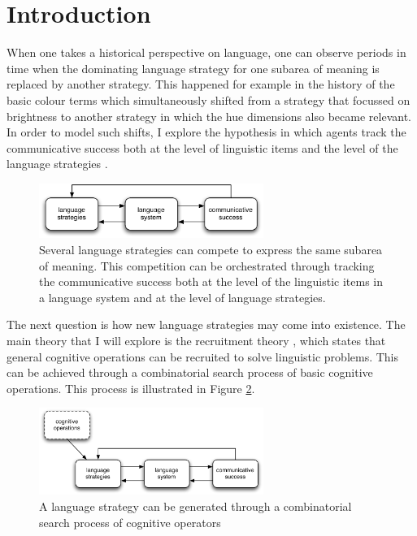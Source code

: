 \section*{Introduction}

\addtocounter{chapter}{1}
\setcounter{figure}{0}

When one takes a historical perspective on language, one can observe
periods in time when the dominating language strategy for one subarea
of meaning is replaced by another strategy. This happened for example
in the history of the basic colour terms which simultaneously shifted
from a strategy that focussed on brightness to another strategy in
which the hue dimensions also became relevant. In order to model such
shifts, I explore the hypothesis in which agents track the
communicative success both at the level of linguistic items and the
level of the language strategies \citep{bleys09linguistic}.

\begin{figure}[htbp]
  \begin{center}
    \includegraphics[width=0.65\textwidth]{./intro/figures/strategies-2.pdf}
    \caption[Several strategies competing to express the same subarea
    of meaning]{Several language strategies can compete to express the
      same subarea of meaning. This competition can be orchestrated
      through tracking the communicative success both at the level of
      the linguistic items in a language system and at the level of
      language strategies.}
    \label{f:strategies-2}
  \end{center}
\end{figure}

The next question is how new language strategies may come into
existence. The main theory that I will explore is the recruitment
theory \citep{steels07recruitment}, which states that general
cognitive operations can be recruited to solve linguistic
problems. This can be achieved through a combinatorial search process
of basic cognitive operations. This process is illustrated in Figure
\ref{f:strategies-3}.

\begin{figure}[htbp]
  \begin{center}
    \includegraphics[width=0.65\textwidth]{./intro/figures/strategies-3.pdf}
    \caption[The origins of language strategies]{A language strategy
      can be generated through a combinatorial search process of
      cognitive operators}
    \label{f:strategies-3}
  \end{center}
\end{figure}

\addtocounter{chapter}{-1}

\thispagestyle{empty}